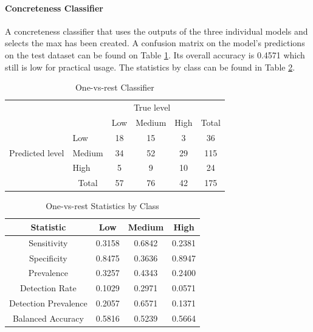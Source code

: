 \documentclass[12pt, a4paper]{article}
\begin{document}
\paragraph{Concreteness Classifier}

A concreteness classifier that uses the outputs of the three individual models and selects the max has been created. A confusion matrix on the model's predictions on the test dataset can be found on Table \ref{table:onevall}. Its overall accuracy is 0.4571 which still is low for practical usage. The statistics by class can be found in Table \ref{table:onevallstats}.

\begin{table}[ht]
\centering
\begin{tabular}{l|l|c|c|c|c}
\multicolumn{2}{c}{}&\multicolumn{3}{c}{True level}&\\
\cline{3-5}
\multicolumn{2}{c|}{}&Low&Medium&High&\multicolumn{1}{c}{Total}\\
\cline{2-5}
\multirow{3}{*}{Predicted level}& Low & 18 & 15 & 3 & 36\\
\cline{2-5}
& Medium & 34 & 52 & 29 & 115\\
\cline{2-5}
& High & 5 & 9 & 10 & 24\\
\cline{2-5}
\multicolumn{1}{c}{} & \multicolumn{1}{c}{Total} & \multicolumn{1}{c}{57} & \multicolumn{    1}{c}{76} & \multicolumn{    1}{c}{42} & \multicolumn{1}{c}{175}\\
\end{tabular}
\caption{One-vs-rest Classifier}
\label{table:onevall}
\end{table}

\begin{table}[ht]
\centering
\begin{tabular}{||c c c c||} 
 \hline
 Statistic & Low & Medium & High \\ [0.5ex] 
 \hline\hline
 Sensitivity & 0.3158 & 0.6842 & 0.2381 \\ 
 Specificity & 0.8475 & 0.3636 & 0.8947 \\
 Prevalence & 0.3257 & 0.4343 & 0.2400 \\
 Detection Rate & 0.1029 & 0.2971 & 0.0571 \\
 Detection Prevalence  & 0.2057 & 0.6571 & 0.1371 \\ 
 Balanced Accuracy  & 0.5816 & 0.5239 & 0.5664 \\ [1ex] 
 \hline
\end{tabular}
\caption{One-vs-rest Statistics by Class}
\label{table:onevallstats}
\end{table}
\end{document}
